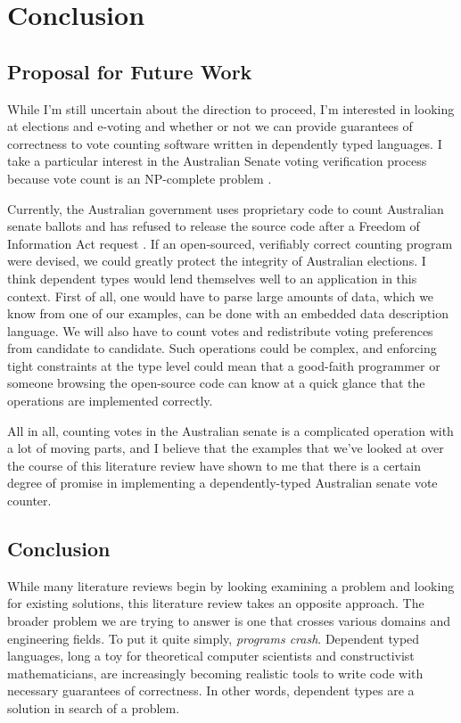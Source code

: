 
\chapter{Conclusion}

\section{Proposal for Future Work}

While I'm still uncertain about the direction to proceed, I'm interested in
looking at elections and e-voting and whether or not we can provide guarantees
of correctness to vote counting software written in dependently typed languages.
I take a particular interest in the Australian Senate voting verification
process because vote count is an NP-complete problem \cite{aus_senate}. 

Currently, the Australian government uses proprietary code to count Australian
senate ballots and has refused to release the source code after a Freedom of
Information Act request \cite{aus_senate_news}. If an open-sourced, verifiably
correct counting program were devised, we could greatly protect the integrity of
Australian elections. I think dependent types would lend themselves well to an
application in this context. First of all, one would have to parse large amounts
of data, which we know from one of our examples, can be done with an embedded
data description language. We will also have to count votes and redistribute
voting preferences from candidate to candidate. Such operations could be
complex, and enforcing tight constraints at the type level could mean that a
good-faith programmer or someone browsing the open-source code can know at a
quick glance that the operations are implemented correctly. 

All in all, counting votes in the Australian senate is a complicated operation
with a lot of moving parts, and I believe that the examples that we've looked at
over the course of this literature review have shown to me that there is a
certain degree of promise in implementing a dependently-typed Australian senate
vote counter. 

\section{Conclusion}
While many literature reviews begin by looking examining a problem and looking
for existing solutions, this literature review takes an opposite approach. The
broader problem we are trying to answer is one that crosses various domains and
engineering fields. To put it quite simply, \textit{programs crash}. Dependent
typed languages, long a toy for theoretical computer scientists and
constructivist mathematicians, are increasingly becoming realistic tools to
write code with necessary guarantees of correctness. In other words, dependent
types are a solution in search of a problem. 

